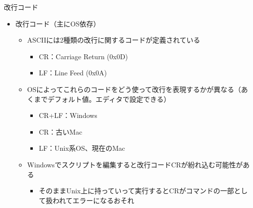 \documentclass[12pt,aspectratio=169]{beamer}
\begin{document}
\begin{frame}{改行コード}
  \begin{itemize}
    \item 改行コード（主にOS依存）
      \begin{itemize}
        \item ASCIIには2種類の改行に関するコードが定義されている
          \begin{itemize}
            \item CR：Carriage Return (0x0D)
            \item LF：Line Feed (0x0A)
          \end{itemize}
        \item OSによってこれらのコードをどう使って改行を表現するかが異なる（あくまでデフォルト値。エディタで設定できる）
          \begin{itemize}
            \item CR+LF：Windows
            \item CR：古いMac
            \item LF：Unix系OS、現在のMac
          \end{itemize}
        \item Windowsでスクリプトを編集すると改行コードCRが紛れ込む可能性がある
          \begin{itemize}
            \item そのままUnix上に持っていって実行するとCRがコマンドの一部として扱われてエラーになるおそれ
          \end{itemize}

      \end{itemize}

  \end{itemize}

\end{frame}
\end{document}
